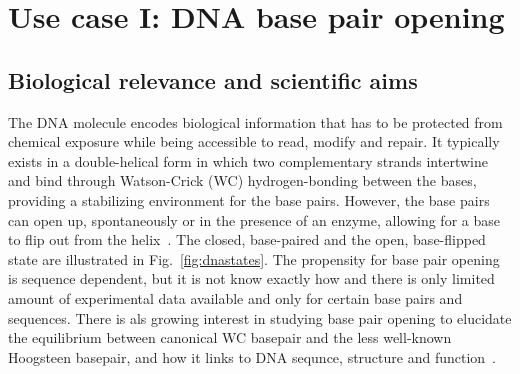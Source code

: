 \documentclass[11pt,a4paper]{article}
\begin{document}
\section{Use case I: DNA base pair opening}

\subsection{Biological relevance and scientific aims}
The DNA molecule encodes biological information that has to be protected from chemical exposure while being accessible to read, modify and repair. It typically exists in a double-helical form in which two complementary strands intertwine and bind through Watson-Crick (WC) hydrogen-bonding between the bases, providing a stabilizing environment for the base pairs. However, the base pairs can open up, spontaneously or in the presence of an enzyme, allowing for a base to flip out from the helix~\cite{knips2017both}. The closed, base-paired and the open, base-flipped state are illustrated in Fig.~\ref{fig:dnastates}. The propensity for base pair opening  is sequence dependent, but it is not know exactly how and there is only limited amount of experimental data available and only for certain  base pairs and sequences. There is als growing interest in studying base pair opening to elucidate the equilibrium between canonical WC basepair and the less well-known Hoogsteen basepair, and how it links to DNA sequnce, structure and function~\cite{chakraborty2017energy}.
\end{document}
